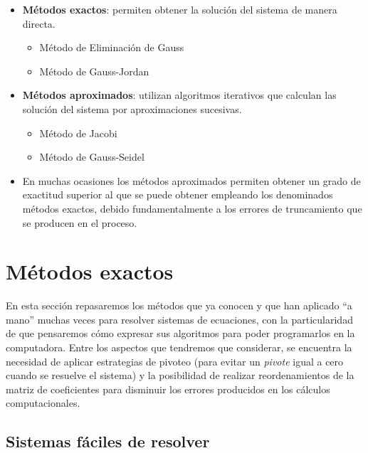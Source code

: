 \documentclass[openany]{book}
\providecommand{\tightlist}{%
  \setlength{\itemsep}{0pt}\setlength{\parskip}{0pt}}
\begin{document}
\begin{itemize}
\item
  \textbf{Métodos exactos}: permiten obtener la solución del sistema de manera directa.

  \begin{itemize}
  \tightlist
  \item
    Método de Eliminación de Gauss
  \item
    Método de Gauss-Jordan
  \end{itemize}
\item
  \textbf{Métodos aproximados}: utilizan algoritmos iterativos que calculan las solución del sistema por aproximaciones sucesivas.

  \begin{itemize}
  \tightlist
  \item
    Método de Jacobi
  \item
    Método de Gauss-Seidel
  \end{itemize}
\item
  En muchas ocasiones los métodos aproximados permiten obtener un grado de exactitud superior al que se puede obtener empleando los denominados métodos exactos, debido fundamentalmente a los errores de truncamiento que se producen en el proceso.
\end{itemize}

\hypertarget{muxe9todos-exactos}{%
\section{Métodos exactos}\label{muxe9todos-exactos}}

En esta sección repasaremos los métodos que ya conocen y que han aplicado ``a mano'' muchas veces para resolver sistemas de ecuaciones, con la particularidad de que pensaremos cómo expresar sus algoritmos para poder programarlos en la computadora. Entre los aspectos que tendremos que considerar, se encuentra la necesidad de aplicar estrategias de pivoteo (para evitar un \emph{pivote} igual a cero cuando se resuelve el sistema) y la posibilidad de realizar reordenamientos de la matriz de coeficientes para disminuir los errores producidos en los cálculos computacionales.

\hypertarget{sistemas-fuxe1ciles-de-resolver}{%
\subsection{Sistemas fáciles de resolver}\label{sistemas-fuxe1ciles-de-resolver}}
\end{document}
